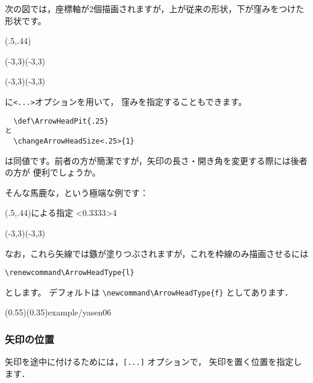次の図では，座標軸が2個描画されますが，上が従来の形状，下が窪みをつけた形状です。

\begin{showEx}(.5,.44){}
\begin{zahyou}[ul=8mm](-3,3)(-3,3)
  \ArrowLine\LB\RT
\end{zahyou}

\def\ArrowHeadPit{0.25}
\begin{zahyou}[ul=8mm](-3,3)(-3,3)
  \ArrowLine\LB\RT
\end{zahyou}
\end{showEx}

に\verb+<...>+オプションを用いて，
窪みを指定することもできます。
\begin{jquote}
\begin{verbatim}
  \def\ArrowHeadPit{.25}
と
  \changeArrowHeadSize<.25>{1}
\end{verbatim}
は同値です。前者の方が簡潔ですが，矢印の長さ・開き角を変更する際には後者の方が
便利でしょうか。

そんな馬鹿な，という極端な例です：

\begin{showEx}(.5,.44){による指定}
\changeArrowHeadSize[30]<0.3333>{4}


\begin{zahyou}[ul=8mm](-3,3)(-3,3)
  \ArrowLine\LB\RT
\end{zahyou}
\end{showEx}

\end{jquote}

なお，これら矢線では鏃が塗りつぶされますが，これを枠線のみ描画させるには
\begin{jquote}
\begin{verbatim}
\renewcommand\ArrowHeadType{l}
\end{verbatim}
\end{jquote}
とします。
デフォルトは \verb/\newcommand\ArrowHeadType{f}/ としてあります．

\showexample[塗りつぶさない鏃](0.55)(0.35){example/yasen06}

\subsubsection{矢印の位置}
矢印を途中に付けるためには，\texttt{[...]} オプションで，
矢印を置く位置を指定します．

